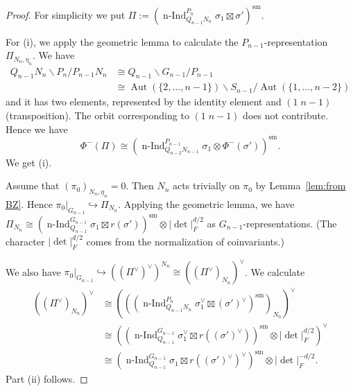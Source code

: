 \documentclass[a4paper]{amsart}
\numberwithin{equation}{section}
\theoremstyle{remark}
\theoremstyle{definition}
\DeclareMathOperator{\nInd}{n-Ind}
\DeclareMathOperator{\Aut}{Aut}
\newcommand{\sm}{\mathrm{sm}}
\renewcommand{\simeq}{\cong}
\begin{document}
\begin{proof}
For simplicity we put $\Pi := (\nInd_{Q_{n - 1}N_{n}}^{P_{n}}\sigma_{1}\boxtimes\sigma')^{\sm}$.

For (i), we apply the geometric lemma to calculate the $P_{n - 1}$-representation $\Pi_{N_{n},\eta_{n}}$.
We have
\begin{align*}
Q_{n - 1}N_{n}\backslash P_{n}/P_{n - 1}N_{n} & \simeq Q_{n - 1}\backslash G_{n - 1}/P_{n - 1}\\
& \simeq \Aut(\{2,\ldots,n - 1\})\backslash S_{n - 1}/\Aut(\{1,\ldots,n - 2\})
\end{align*}
and it has two elements, represented by the identity element and $(1\; n - 1)$ (transposition).
The orbit corresponding to $(1\; n - 1)$ does not contribute.
Hence we have
\[
\Phi^{-}(\Pi)\simeq (\nInd_{Q_{n - 2}N_{n - 1}}^{P_{n - 1}}\sigma_{1}\otimes \Phi^{-}(\sigma'))^{\sm}.
\]
We get (i).

Assume that $(\pi_{0})_{N_{n},\eta_{n}}  = 0$.
Then $N_{n}$ acts trivially on $\pi_{0}$ by Lemma~\ref{lem:from BZ}.
Hence $\pi_{0}|_{G_{n - 1}}\hookrightarrow \Pi_{N_{n}}$.
Applying the geometric lemma, we have $\Pi_{N_{n}}\simeq (\nInd_{Q_{n - 1}}^{G_{n - 1}}\sigma_1\boxtimes r(\sigma'))^{\sm}\otimes \lvert \det\rvert_{F}^{d/2}$ as $G_{n-1}$-representations.
(The character $\lvert \det\rvert_{F}^{d/2}$ comes from the normalization of coinvariants.)

We also have $\pi_{0}|_{G_{n - 1}}\hookrightarrow ((\Pi^{\vee})^{\vee})^{N_{n}} \simeq ((\Pi^{\vee})_{N_{n}})^{\vee}$.
We calculate
\begin{align*}
((\Pi^{\vee})_{N_{n}})^{\vee} & \simeq (((\nInd_{Q_{n - 1}N_{n}}^{P_{n}}\sigma_{1}^{\vee}\boxtimes(\sigma')^{\vee})^{\sm})_{N_{n}})^{\vee}\\
& \simeq ((\nInd_{Q_{n - 1}}^{G_{n - 1}}\sigma_{1}^{\vee}\boxtimes r((\sigma')^{\vee}))^{\sm}\otimes \lvert\det\rvert_{F}^{d/2})^{\vee}\\
& \simeq (\nInd_{Q_{n - 1}}^{G_{n - 1}}\sigma_{1}\boxtimes r((\sigma')^{\vee})^{\vee})^{\sm}\otimes \lvert\det\rvert_{F}^{-d/2}.
\end{align*}
Part (ii) follows.
\end{proof}
\end{document}
